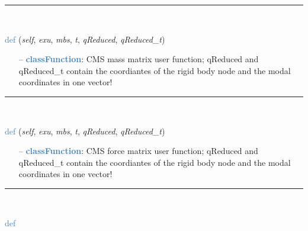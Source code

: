 \begin{itemize}[leftmargin=1.4cm]
\begin{itemize}[leftmargin=1.4cm]
\begin{itemize}[leftmargin=1.4cm]
\begin{itemize}[leftmargin=0.5cm]
\begin{itemize}[leftmargin=1.4cm]
\begin{itemize}[leftmargin=1.4cm]
\begin{itemize}[leftmargin=0.5cm]
\begin{itemize}[leftmargin=0.7cm]
\begin{lstlisting}[language=Python, xleftmargin=36pt]
\end{lstlisting}\vspace{-24pt}\bi\item[]\vspace{-24pt}\vspace{12pt}\end{itemize}
%
\noindent\rule{8cm}{0.75pt}\vspace{1pt} \\ 
\begin{flushleft}
\noindent \textcolor{steelblue}{def {\bf {}}}\label{sec:FEM:ObjectFFRFreducedOrderInterface:UFmassFFRFreducedOrder}
({\it self}, {\it exu}, {\it mbs}, {\it t}, {\it qReduced}, {\it qReduced\_t})
\end{flushleft}
\setlength{\itemindent}{0.7cm}
\begin{itemize}[leftmargin=0.7cm]
\item[--]\textcolor{steelblue}{\bf classFunction}: CMS mass matrix user function; qReduced and qReduced\_t contain the coordiantes of the rigid body node and the modal coordinates in one vector!
\vspace{12pt}\end{itemize}
%
\noindent\rule{8cm}{0.75pt}\vspace{1pt} \\ 
\begin{flushleft}
\noindent \textcolor{steelblue}{def {\bf {}}}\label{sec:FEM:ObjectFFRFreducedOrderInterface:UFforceFFRFreducedOrder}
({\it self}, {\it exu}, {\it mbs}, {\it t}, {\it qReduced}, {\it qReduced\_t})
\end{flushleft}
\setlength{\itemindent}{0.7cm}
\begin{itemize}[leftmargin=0.7cm]
\item[--]\textcolor{steelblue}{\bf classFunction}: CMS force matrix user function; qReduced and qReduced\_t contain the coordiantes of the rigid body node and the modal coordinates in one vector!
\vspace{12pt}\end{itemize}
%
\noindent\rule{8cm}{0.75pt}\vspace{1pt} \\ 
\begin{flushleft}
\noindent \textcolor{steelblue}{def {\bf {}}}\label{sec:FEM:ObjectFFRFreducedOrderInterface:AddObjectFFRFreducedOrder}

\end{flushleft}
\end{itemize}
\end{itemize}
\end{itemize}
\end{itemize}
\end{itemize}
\end{itemize}
\end{itemize}
